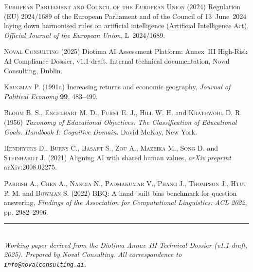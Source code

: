 \documentclass[10pt, a4paper, twocolumn]{article}
\begin{document}
\begin{small}
\setlength{\parskip}{3pt}
\noindent
\textsc{European Parliament and Council of the European Union} (2024)
Regulation (EU) 2024/1689 of the European Parliament and of the Council of
13~June~2024 laying down harmonised rules on artificial intelligence (Artificial
Intelligence Act), \textit{Official Journal of the European Union}, L~2024/1689.

\medskip\noindent
\textsc{Noval Consulting} (2025)
Diotima AI Assessment Platform: Annex~III High-Risk AI Compliance Dossier, v1.1-draft.
Internal technical documentation, Noval Consulting, Dublin.

\medskip\noindent
\textsc{Krugman P.} (1991a)
Increasing returns and economic geography,
\textit{Journal of Political Economy} \textbf{99}, 483--499.

\medskip\noindent
\textsc{Bloom B. S., Engelhart M. D., Furst E. J., Hill W. H.} and \textsc{Krathwohl D. R.}
(1956) \textit{Taxonomy of Educational Objectives: The Classification of Educational
Goals. Handbook I: Cognitive Domain}. David McKay, New York.

\medskip\noindent
\textsc{Hendrycks D., Burns C., Basart S., Zou A., Mazeika M., Song D.}
and \textsc{Steinhardt J.} (2021) Aligning AI with shared human values,
\textit{arXiv preprint} arXiv:2008.02275.

\medskip\noindent
\textsc{Parrish A., Chen A., Nangia N., Padmakumar V., Phang J., Thompson J.,
Htut P. M.} and \textsc{Bowman S.} (2022) BBQ: A hand-built bias benchmark for
question answering, \textit{Findings of the Association for Computational
Linguistics: ACL 2022}, pp. 2982--2996.
\end{small}

\vspace{10pt}
\noindent\rule{\columnwidth}{0.4pt}\\
{\footnotesize\textit{Working paper derived from the Diotima Annex~III Technical
Dossier (v1.1-draft, 2025). Prepared by Noval Consulting. All correspondence to
\texttt{info@novalconsulting.ai}.}}
\end{document}
